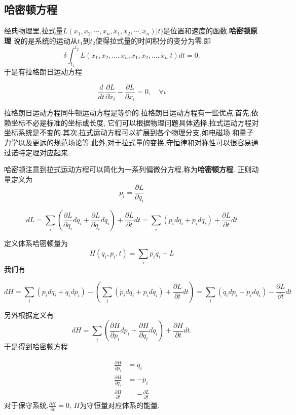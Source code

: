 \subsection{哈密顿方程}
经典物理里,拉式量$L(x_1, x_2, \cdots, x_n, \dot{x}_1, \dot{x}_2, \cdots, \dot{x}_n)|t)$是位置和速度的函数.\textbf{哈密顿原理}
说的是系统的运动从$t_1$到$t_2$使得拉式量的时间积分的变分为零.即
\begin{equation}
    \delta \int_{t_1}^{t_2} L\left(x_1, x_2, \ldots, x_n, \dot{x}_1, \dot{x}_2, \ldots, \dot{x}_n | t\right) d t=0 .
\end{equation}
于是有拉格朗日运动方程

\begin{equation}
    \frac{d}{d t} \frac{\partial L}{\partial \dot{x}_i}-\frac{\partial L}{\partial x_i}=0, \quad \forall i
\end{equation}

拉格朗日运动方程同牛顿运动方程是等价的.拉格朗日运动方程有一些优点.首先,依赖坐标不必是标准的坐标或长度,
它们可以根据物理问题具体选择,拉式运动方程对坐标系统是不变的.其次,拉式运动方程可以扩展到各个物理分支,如电磁场
和量子力学以及更远的规范场论等.此外,对于拉式量的变换,守恒律和对称性可以很容易通过诺特定理对应起来.


哈密顿注意到拉式运动方程可以简化为一系列偏微分方程,称为\textbf{哈密顿方程}.
正则动量定义为
\begin{equation}
    p_i=\frac{\partial L}{\partial \dot{q}_i}
\end{equation}

\begin{equation}
    d L=\sum_i\left(\frac{\partial L}{\partial q_i} d q_i+\frac{\partial L}{\partial \dot{q}_i} d \dot{q}_i\right)+\frac{\partial L}{\partial t} d t=\sum_i\left(\dot{p}_i d q_i+p_i d \dot{q}_i\right)+\frac{\partial L}{\partial t} d t
\end{equation}

定义体系哈密顿量为
\begin{equation}
    H(q_i, p_i, t)=\sum_i p_i \dot{q}_i-L 
\end{equation}
我们有

\begin{equation}
    d H=\sum_i\left(p_i d \dot{q}_i+\dot{q}_i d p_i\right)-\left(\sum_i\left(\dot{p}_i d q_i+p_i d \dot{q}_i\right)+\frac{\partial L}{\partial t} d t\right)=\sum_i\left(\dot{q}_i d p_i-\dot{p}_i d q_i\right)-\frac{\partial L}{\partial t} d t
\end{equation}

另外根据定义有
\begin{equation}
    d H=\sum_i\left(\frac{\partial H}{\partial p_i} d p_i+\frac{\partial H}{\partial q_i} d q_i\right)+\frac{\partial H}{\partial t} d t .
\end{equation}
于是得到哈密顿方程

\begin{align}
    \frac{\partial H}{\partial p_i}&=\dot{q}_i
    \\
    \frac{\partial H}{\partial q_i}&=-\dot{p}_i
    \\
    \frac{\partial H}{\partial t}&=-\frac{\partial L}{\partial t}
\end{align}
对于保守系统,$\frac{\partial H}{\partial t}=0$, $H$为守恒量对应体系的能量.